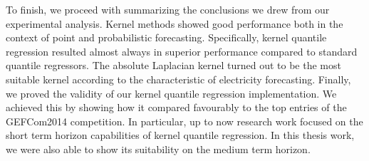To finish, we proceed with summarizing the conclusions we drew from our experimental analysis.
Kernel methods showed good performance both in the context of point and probabilistic forecasting.
Specifically, kernel quantile regression resulted almost always in superior performance compared to standard quantile regressors. The absolute Laplacian kernel turned out to be the most suitable kernel according to the characteristic of electricity forecasting. Finally, we proved the validity of our kernel quantile regression implementation. We achieved this by showing how it compared favourably to the top entries of the GEFCom2014 competition. 
In particular, up to now research work focused on the short term horizon capabilities of kernel quantile regression. In this thesis work, we were also able to show its suitability on the medium term horizon. 